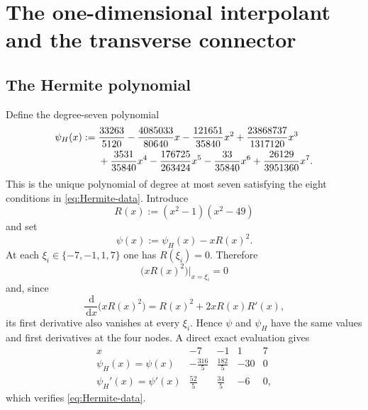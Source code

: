 \documentclass[11pt,reqno]{amsart}
\theoremstyle{definition}
\newcommand{\dd}{\,\mathrm{d}}
\newcommand{\restr}[1]{\big|_{#1}}
\begin{document}
\section{The one-dimensional interpolant and the transverse connector}
\label{sec:connector}

\subsection{The Hermite polynomial}

Define the degree-seven polynomial
\begin{align}
  \psi_H(x)
  :={}&
  \frac{33263}{5120}
  -\frac{4085033}{80640}x
  -\frac{121651}{35840}x^2
  +\frac{23868737}{1317120}x^3\notag\\
  &+\frac{3531}{35840}x^4
  -\frac{176725}{263424}x^5
  -\frac{33}{35840}x^6
  +\frac{26129}{3951360}x^7.
  \label{eq:psi-H}
\end{align}
This is the unique polynomial of degree at most seven satisfying the eight
conditions in \cref{eq:Hermite-data}.  Introduce
\begin{equation}
  R(x):=(x^2-1)(x^2-49)
  \label{eq:R-polynomial}
\end{equation}
and set
\begin{equation}
  \psi(x):=\psi_H(x)-xR(x)^2.
  \label{eq:psi-definition}
\end{equation}
At each $\xi_i\in\{-7,-1,1,7\}$ one has $R(\xi_i)=0$.  Therefore
\begin{equation}
  \bigl(xR(x)^2\bigr)\restr{x=\xi_i}=0
\end{equation}
and, since
\begin{equation}
  \frac{\dd}{\dd x}\bigl(xR(x)^2\bigr)=R(x)^2+2xR(x)R'(x),
\end{equation}
its first derivative also vanishes at every $\xi_i$.  Hence $\psi$ and
$\psi_H$ have the same values and first derivatives at the four nodes.  A
direct exact evaluation gives
\begin{equation}
\renewcommand{\arraystretch}{1.25}
\begin{array}{c|rrrr}
  x&-7&-1&1&7\\
  \hline
  \psi_H(x)=\psi(x)&-\frac{316}{5}&\frac{182}{5}&-30&0\\[1mm]
  \psi_H'(x)=\psi'(x)&\frac{52}{5}&\frac{34}{5}&-6&0,
\end{array}
\label{eq:Hermite-verification}
\end{equation}
which verifies \cref{eq:Hermite-data}.
\end{document}
